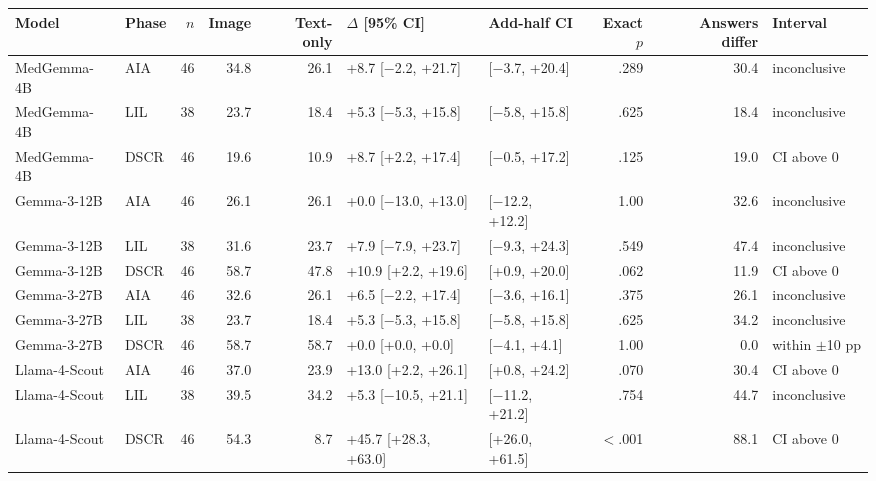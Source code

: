 \begin{tabular}{llrrrllrrl}
\toprule
Model & Phase & $n$ & Image & Text-only & $\Delta$ [95\% CI] & Add-half CI & Exact $p$ & Answers differ & Interval \\
\midrule
MedGemma-4B & AIA & 46 & 34.8 & 26.1 & +8.7 [$-$2.2, +21.7] & [$-$3.7, +20.4] & .289 & 30.4 & inconclusive \\
MedGemma-4B & LIL & 38 & 23.7 & 18.4 & +5.3 [$-$5.3, +15.8] & [$-$5.8, +15.8] & .625 & 18.4 & inconclusive \\
MedGemma-4B & DSCR & 46 & 19.6 & 10.9 & +8.7 [+2.2, +17.4] & [$-$0.5, +17.2] & .125 & 19.0 & CI above 0 \\
Gemma-3-12B & AIA & 46 & 26.1 & 26.1 & +0.0 [$-$13.0, +13.0] & [$-$12.2, +12.2] & 1.00 & 32.6 & inconclusive \\
Gemma-3-12B & LIL & 38 & 31.6 & 23.7 & +7.9 [$-$7.9, +23.7] & [$-$9.3, +24.3] & .549 & 47.4 & inconclusive \\
Gemma-3-12B & DSCR & 46 & 58.7 & 47.8 & +10.9 [+2.2, +19.6] & [+0.9, +20.0] & .062 & 11.9 & CI above 0 \\
Gemma-3-27B & AIA & 46 & 32.6 & 26.1 & +6.5 [$-$2.2, +17.4] & [$-$3.6, +16.1] & .375 & 26.1 & inconclusive \\
Gemma-3-27B & LIL & 38 & 23.7 & 18.4 & +5.3 [$-$5.3, +15.8] & [$-$5.8, +15.8] & .625 & 34.2 & inconclusive \\
Gemma-3-27B & DSCR & 46 & 58.7 & 58.7 & +0.0 [+0.0, +0.0] & [$-$4.1, +4.1] & 1.00 & 0.0 & within $\pm$10 pp \\
Llama-4-Scout & AIA & 46 & 37.0 & 23.9 & +13.0 [+2.2, +26.1] & [+0.8, +24.2] & .070 & 30.4 & CI above 0 \\
Llama-4-Scout & LIL & 38 & 39.5 & 34.2 & +5.3 [$-$10.5, +21.1] & [$-$11.2, +21.2] & .754 & 44.7 & inconclusive \\
Llama-4-Scout & DSCR & 46 & 54.3 & 8.7 & +45.7 [+28.3, +63.0] & [+26.0, +61.5] & $<$.001 & 88.1 & CI above 0 \\
\bottomrule
\end{tabular}
